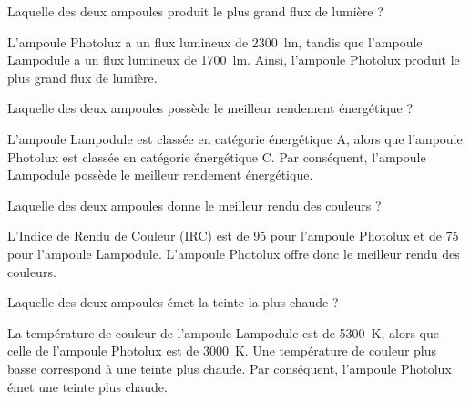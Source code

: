 \documentclass[answers]{exam}
\begin{document}
    \begin{solution}
\begin{questions}

\item Laquelle des deux ampoules produit le plus grand flux de lumière ?

\begin{solution}
L'ampoule Photolux a un flux lumineux de \SI{2300}{lm}, tandis que l'ampoule Lampodule a un flux lumineux de \SI{1700}{lm}. Ainsi, l'ampoule Photolux produit le plus grand flux de lumière.
\end{solution}

\item Laquelle des deux ampoules possède le meilleur rendement énergétique ?

\begin{solution}
L'ampoule Lampodule est classée en catégorie énergétique A, alors que l'ampoule Photolux est classée en catégorie énergétique C. Par conséquent, l'ampoule Lampodule possède le meilleur rendement énergétique.
\end{solution}

\item Laquelle des deux ampoules donne le meilleur rendu des couleurs ?

\begin{solution}
L'Indice de Rendu de Couleur (IRC) est de 95 pour l'ampoule Photolux et de 75 pour l'ampoule Lampodule. L'ampoule Photolux offre donc le meilleur rendu des couleurs.
\end{solution}

\item Laquelle des deux ampoules émet la teinte la plus chaude ?

\begin{solution}
La température de couleur de l'ampoule Lampodule est de \SI{5300}{K}, alors que celle de l'ampoule Photolux est de \SI{3000}{K}. Une température de couleur plus basse correspond à une teinte plus chaude. Par conséquent, l'ampoule Photolux émet une teinte plus chaude.
\end{solution}

\end{questions}
\end{solution}
\end{document}
